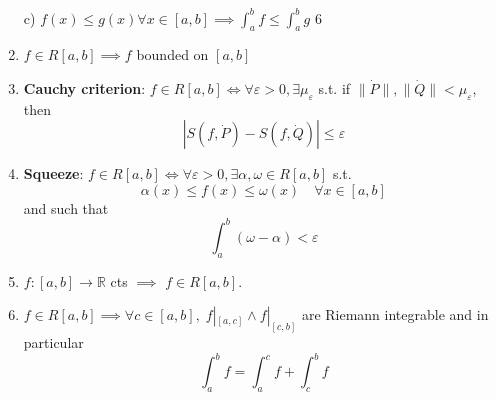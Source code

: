 \documentclass[10pt,landscape]{article}
\begin{document}
\begin{multicols}{3}
\begin{enumerate}
	c) $f(x) \leq g(x) \forall x \in [a,b] \implies \int^b_a f \leq \int^b_a g$
	6
	\item $f\in R[a,b] \implies f $ bounded on $[a,b]$ 
	
	\item \textbf{Cauchy criterion}: $f \in R[a,b] \iff \forall \varepsilon >0, \exists \mu_\varepsilon$ s.t. if $\|\dot{P} \| , \| \dot{Q}\| < \mu_\varepsilon$, then 
	$$| S(f, \dot{P} ) - S(f, \dot{Q} ) | \leq \varepsilon$$
	
	\item \textbf{Squeeze}: $f\in R[a,b] \iff \forall \varepsilon > 0, \exists \alpha, \omega \in R[a,b]$ s.t. 
	$$\alpha(x) \leq f(x) \leq \omega(x) \quad \forall x \in[a,b]$$
	and such that
	$$\int^b_a (\omega- \alpha ) < \varepsilon $$
	
	\item $f:[a,b] \rightarrow \mathbb{R}$ cts $\implies$ $f\in R[a,b]$.
	\item $f\in R[a,b] \implies \forall c \in [a,b], \; f|_{[a,c]} \land f|_{[c,b]}$ are Riemann integrable and in particular
	$$\int^b_a f = \int^c_a f + \int^b_c f$$
\end{enumerate}

\end{multicols}
\end{document}
